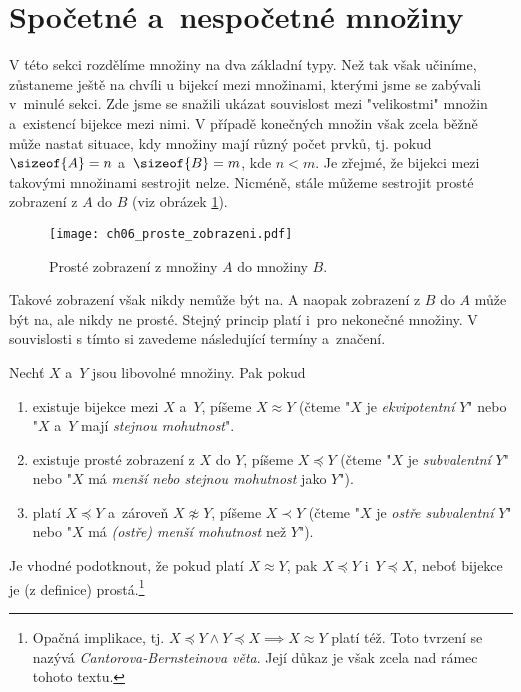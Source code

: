 \section{Spočetné a~nespočetné množiny}\label{sec:spocetne_a_nespocetne_mnoziny}
V této sekci rozdělíme množiny na dva základní typy. Než tak však učiníme, zůstaneme ještě na chvíli u bijekcí mezi množinami, kterými jsme se zabývali v~minulé sekci. Zde jsme se snažili ukázat souvislost mezi "velikostmi" množin a~existencí bijekce mezi nimi. V případě konečných množin však zcela běžně může nastat situace, kdy množiny mají různý počet prvků, tj. pokud $\sizeof{A}=n$ a~$\sizeof{B}=m$, kde $n<m$. Je zřejmé, že bijekci mezi takovými množinami sestrojit nelze. Nicméně, stále můžeme sestrojit prosté zobrazení z $A$ do $B$ (viz obrázek \ref{fig:proste_zobrazeni_A_do_B}).
\begin{figure}[H]
    \centering
    \texttt{[image: ch06\_proste\_zobrazeni.pdf]}
    \caption{Prosté zobrazení z množiny $A$ do množiny $B$.}
    \label{fig:proste_zobrazeni_A_do_B}
\end{figure}
Takové zobrazení však nikdy nemůže být na. A naopak zobrazení z $B$ do $A$ může být na, ale nikdy ne prosté. Stejný princip platí i~pro nekonečné množiny. V souvislosti s tímto si zavedeme následující termíny a~značení.
\begin{definition}\label{def:subvalence_a_ekvipotence}
    Nechť $X$ a~$Y$ jsou libovolné množiny. Pak pokud
    \begin{enumerate}[label=(\roman*)]
        \item existuje bijekce mezi $X$ a~$Y$, píšeme $X\approx Y$ (čteme "$X$ je \emph{ekvipotentní} $Y$" nebo "$X$ a~$Y$ mají \emph{stejnou mohutnost}".
        \item existuje prosté zobrazení z $X$ do $Y$, píšeme $X\preccurlyeq Y$ (čteme "$X$ je \emph{subvalentní} $Y$" nebo "$X$ má \emph{menší nebo stejnou mohutnost} jako $Y$").
        \item platí $X\preccurlyeq Y$ a~zároveň $X\napprox Y$, píšeme $X\prec Y$ (čteme "$X$ je \emph{ostře subvalentní} $Y$" nebo "$X$ má \emph{(ostře) menší mohutnost} než $Y$").
    \end{enumerate}
\end{definition}
Je vhodné podotknout, že pokud platí $X\approx Y$, pak $X\preccurlyeq Y$ i~$Y\preccurlyeq X$, neboť bijekce je (z definice) prostá.\footnote{Opačná implikace, tj. $X\preccurlyeq Y \land Y\preccurlyeq X\implies X\approx Y$ platí též. Toto tvrzení se nazývá \emph{Cantorova-Bernsteinova věta}. Její důkaz je však zcela nad rámec tohoto textu.}\par
